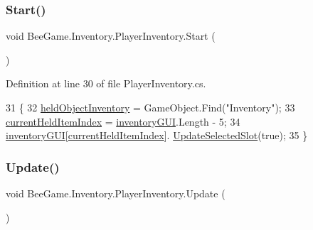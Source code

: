 \subsubsection{\texorpdfstring{Start()}{Start()}}
{\footnotesize\ttfamily void Bee\+Game.\+Inventory.\+Player\+Inventory.\+Start (\begin{DoxyParamCaption}{ }\end{DoxyParamCaption})\hspace{0.3cm}{\ttfamily [private]}}



Definition at line 30 of file Player\+Inventory.\+cs.


\begin{DoxyCode}
31         \{
32             \hyperlink{class_bee_game_1_1_inventory_1_1_player_inventory_a595e1144315e0e9be0b825b538643e1f}{heldObjectInventory} = GameObject.Find(\textcolor{stringliteral}{"Inventory"});
33             \hyperlink{class_bee_game_1_1_inventory_1_1_player_inventory_ac2978979c5c8e45fccc7d3a10882ea1b}{currentHeldItemIndex} = \hyperlink{class_bee_game_1_1_inventory_1_1_inventory_base_a48dcba7ad7bfa1bed8c9ae290fb32857}{inventoryGUI}.Length - 5;
34             \hyperlink{class_bee_game_1_1_inventory_1_1_inventory_base_a48dcba7ad7bfa1bed8c9ae290fb32857}{inventoryGUI}[\hyperlink{class_bee_game_1_1_inventory_1_1_player_inventory_ac2978979c5c8e45fccc7d3a10882ea1b}{currentHeldItemIndex}].
      \hyperlink{class_bee_game_1_1_inventory_1_1_inventory_slot_adc03a9101c901f82a3dfc778db98cf1f}{UpdateSelectedSlot}(\textcolor{keyword}{true});
35         \}
\end{DoxyCode}
\mbox{\label{class_bee_game_1_1_inventory_1_1_player_inventory_a340eeb707be60a6ecf909728deaad6c5}} 
\subsubsection{\texorpdfstring{Update()}{Update()}}
{\footnotesize\ttfamily void Bee\+Game.\+Inventory.\+Player\+Inventory.\+Update (\begin{DoxyParamCaption}{ }\end{DoxyParamCaption})\hspace{0.3cm}{\ttfamily [private]}}



